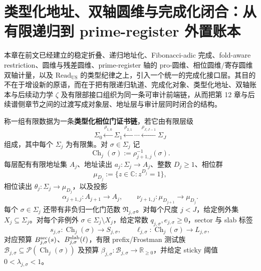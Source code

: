 \section{类型化地址、双轴圆维与完成化闭合：从有限递归到 prime-register 外置账本}\label{sec:typed-address-biaxial-completion}
本章在前文已经建立的稳定折叠、递归地址化、Fibonacci-adic 完成、fold-aware restriction、圆维与残差圆维、prime-register 轴的 pro-圆维、相位圆维/寄存圆维双轴计量，以及 \(\mathrm{Read}_{\mathrm{US}}\) 的类型纪律之上，引入一个统一的完成化接口层。其目的不在于增设新的原语，而在于把有限递归轨道、完成化对象、类型化地址、双轴账本与后续动力学 \(\zeta\) 及有限部接口组织为同一条可审计前端链，从而把第 12 章与后续谱侧章节之间的过渡写成对象层、地址层与审计层同时闭合的结构。

\begin{definition}[类型化相位门证书链]\label{distill:bourgain-multiscale_decoupling_gates-typed-phase-gate-certificate-chain}
称一组有限数据为一条\textbf{类型化相位门证书链}，若它由有限层级
\[
\Sigma_0\xleftarrow{\rho_{1,0}}\Sigma_1\xleftarrow{\rho_{2,1}}\cdots\xleftarrow{\rho_{J,J-1}}\Sigma_J
\]
组成，其中每个 \(\Sigma_j\) 为有限集。对 \(\sigma\in\Sigma_j\) 记
\[
\operatorname{Ch}_j(\sigma):=\rho_{j+1,j}^{-1}(\sigma).
\]
每层配有有限地址集 \(A_j\)、地址读出 \(a_j:\Sigma_j\to A_j\)、整数 \(D_j\ge1\)、相位群
\[
\mu_{D_j}:=\{z\in\mathbb C:z^{D_j}=1\},
\]
相位读出 \(\theta_j:\Sigma_j\to\mu_{D_j}\)，以及投影
\[
\alpha_{j+1,j}:A_{j+1}\to A_j,
\qquad
\nu_{j+1,j}:\mu_{D_{j+1}}\to\mu_{D_j}.
\]
每个 \(\sigma\in\Sigma_j\) 还带有非负归一化门范数 \(\mathfrak N_{j,\sigma}\)。对每个尺度 \(j<J\)，给定例外集 \(X_j\subseteq\Sigma_j\)。对每个非例外 \(\sigma\in\Sigma_j\setminus X_j\)，给定常数 \(q_{j,\sigma},e_{j,\sigma}\ge0\)，sector 与 slab 标签
\[
s_{j,\sigma}:\operatorname{Ch}_j(\sigma)\to S_{j,\sigma},
\qquad
\ell_{j,\sigma}:\operatorname{Ch}_j(\sigma)\to L_{j,\sigma},
\]
对应预算 \(B^{\rm sec}_{j,\sigma}(s)\)、\(B^{\rm slab}_{j,\sigma}(\ell)\)，有限 prefix/Frostman 测试族 \(\mathcal B_{j,\sigma}\subseteq\mathcal P(\operatorname{Ch}_j(\sigma))\) 及预算 \(\beta_{j,\sigma}:\mathcal B_{j,\sigma}\to\mathbb R_{\ge0}\)，并给定 sticky 阈值 \(0<\lambda_{j,\sigma}<1\)。


\end{definition}
